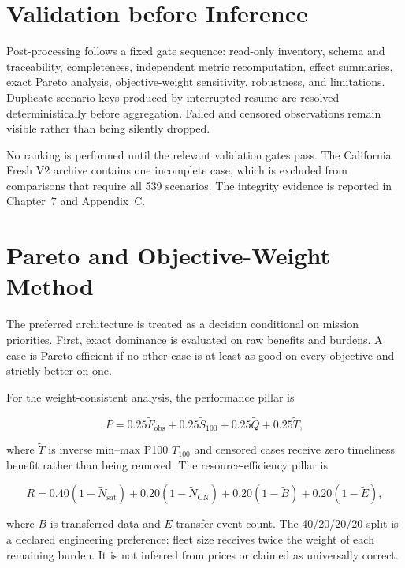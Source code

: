\section{Validation before Inference}

Post-processing follows a fixed gate sequence: read-only inventory, schema and traceability, completeness, independent metric recomputation, effect summaries, exact Pareto analysis, objective-weight sensitivity, robustness, and limitations. Duplicate scenario keys produced by interrupted resume are resolved deterministically before aggregation. Failed and censored observations remain visible rather than being silently dropped.

No ranking is performed until the relevant validation gates pass. The California Fresh V2 archive contains one incomplete case, which is excluded from comparisons that require all 539 scenarios. The integrity evidence is reported in Chapter~7 and Appendix~C.

\section{Pareto and Objective-Weight Method}

The preferred architecture is treated as a decision conditional on mission priorities. First, exact dominance is evaluated on raw benefits and burdens. A case is Pareto efficient if no other case is at least as good on every objective and strictly better on one.

For the weight-consistent analysis, the performance pillar is

\begin{equation}
P=0.25\widetilde F_{\mathrm{obs}}+0.25\widetilde S_{100}
+0.25\widetilde Q+0.25\widetilde T,
\end{equation}

where $\widetilde T$ is inverse min--max P100 $T_{100}$ and censored cases receive zero timeliness benefit rather than being removed. The resource-efficiency pillar is

\begin{equation}
R=0.40(1-\widetilde N_{\mathrm{sat}})+0.20(1-\widetilde N_{\mathrm{CN}})
+0.20(1-\widetilde B)+0.20(1-\widetilde E),
\end{equation}

where $B$ is transferred data and $E$ transfer-event count. The 40/20/20/20 split is a declared engineering preference: fleet size receives twice the weight of each remaining burden. It is not inferred from prices or claimed as universally correct.

